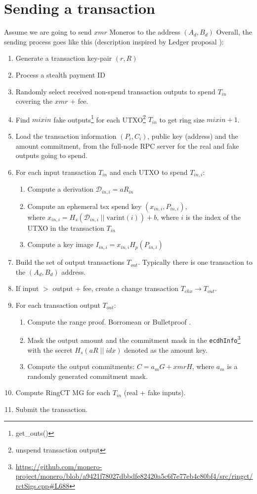 \documentclass[]{article}
\begin{document}
\section{Sending a transaction}
Assume we are going to send $xmr$ Moneros to the address $(A_d, B_d)$
Overall, the sending process goes like this (description inspired by Ledger proposal \cite{ledger_doc}):

\begin{enumerate}
	\item Generate a transaction key-pair $(r, R)$
	\item Process a stealth payment ID
	\item Randomly select received non-spend transaction outputs to spend $T_{in}$ covering the $xmr$ + fee.
	\item Find $mixin$ fake outputs\footnote{get\_outs()} for each UTXO\footnote{unspend transaction output} $T_{in}$ to get ring size $mixin + 1$.
	\item Load the transaction information $(P_i, C_i)$, public key (address) and the amount commitment, from the full-node RPC server for the real and fake outputs going to spend.
	\item For each input transaction $T_{in}$ and each UTXO to spend $T_{in,i}$:
	\begin{enumerate}
		\item Compute a derivation $\mathcal{D}_{in,i} = aR_{in}$
		\item Compute an ephemeral tsx spend key $(x_{in,i}, P_{in,i})$, \\where $x_{in,i} = H_s(\mathcal{D}_{in,i} \; || \; \text{varint}(i)) + b$, where $i$ is the index of the UTXO in the transaction $T_{in}$
		\item Compute a key image $I_{in,i} = x_{in,i}H_p(P_{in,i})$
	\end{enumerate}
	\item Build the set of output transactions $T_{out}$. Typically there is one transaction to the $(A_d, B_d)$ address.
	\item If input $>$ output + fee, create a change transaction $T_{chx} \rightarrow T_{out}$. 
	\item For each transaction output $T_{out}$:
	\begin{enumerate}
		\item Compute the range proof. Borromean or Bulletproof \cite{monero_1098, borromean, Bnz2017BulletproofsSP}.
		\item Mask the output amount and the commitment mask in the \verb|ecdhInfo|\footnote{\url{https://github.com/monero-project/monero/blob/a9421f78027dbbdfe82420a5c6f7e77eb4c80bf4/src/ringct/rctSigs.cpp\#L688}} with the secret $H_s(aR\; || \; idx)$ denoted as the amount key.
		\item Compute the output commitments: $C = a_mG + xmrH$, where $a_m$ is a randomly generated commitment mask.
	\end{enumerate}
	\item Compute RingCT MG for each $T_{in}$ (real + fake inputs).
	\item Submit the transaction.
\end{enumerate}
\end{document}
